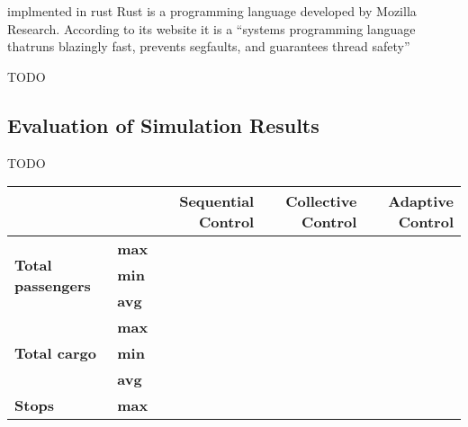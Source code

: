 implmented in  rust
Rust is a programming language developed by Mozilla Research.
According to its website it is a \enquote{systems programming language thatruns blazingly fast, prevents segfaults, and guarantees thread safety}

TODO
\subsection{Evaluation of Simulation Results}
TODO

\begin{table}[]
\centering
\begin{tabular}{llrrr}
                                      &     & \begin{minipage}{2cm}\textbf{Sequential Control} \vspace{1em}\end{minipage} & \begin{minipage}{2cm}\textbf{Collective Control} \vspace{1em}\end{minipage} & \begin{minipage}{2cm}\textbf{Adaptive Control} \vspace{1em}\end{minipage}\\
\hline
\multirow{3}{*}{\textbf{Total passengers}}     & \textbf{max} &                   &                    &                  \\
                                               & \textbf{min} &                   &                    &                  \\
                                               & \textbf{avg} &                   &                    &                  \\
\hline                                               
\multirow{3}{*}{\textbf{Total cargo}}          & \textbf{max} &                   &                    &                  \\
                                               & \textbf{min} &                   &                    &                  \\
                                               & \textbf{avg} &                   &                    &                  \\
\hline                                               
\multirow{3}{*}{\textbf{Stops}}                & \textbf{max} &                   &                    &                  \\

\end{tabular}
\end{table}
